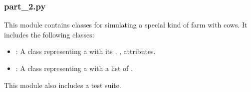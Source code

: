 \documentclass[letterpaper,10pt,english]{sphinxmanual}
\begin{document}
\subsubsection{part\_2.py}
\label{\detokenize{farming:part-2-py}}
\sphinxAtStartPar
This module contains classes for simulating a special kind of farm with cows.  
It includes the following classes:
\begin{itemize}
\item {} 
\sphinxAtStartPar
{\hyperref[\detokenize{farming:farming.part2.Cow}]{}}: A class representing a  with its , ,  attributes.

\item {} 
\sphinxAtStartPar
{\hyperref[\detokenize{farming:farming.part2.Farm}]{}}: A class representing a  with a list of .

\end{itemize}

\sphinxAtStartPar
This module also includes a test suite.
\end{document}
